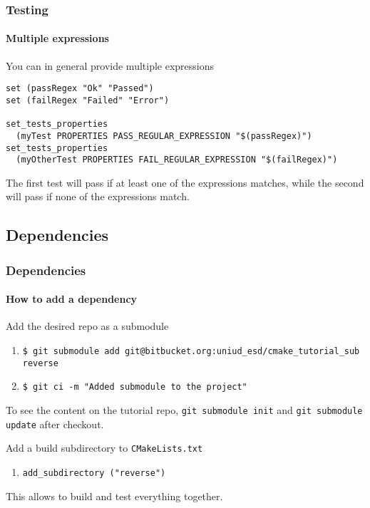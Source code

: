 \begin{frame}[fragile]
\frametitle{Testing}
\framesubtitle{Multiple expressions}

\begin{block}{You can in general provide multiple expressions}
{\scriptsize
\begin{verbatim}
set (passRegex "Ok" "Passed")
set (failRegex "Failed" "Error")

set_tests_properties 
  (myTest PROPERTIES PASS_REGULAR_EXPRESSION "$(passRegex)")
set_tests_properties 
  (myOtherTest PROPERTIES FAIL_REGULAR_EXPRESSION "$(failRegex)")
\end{verbatim}
}
The first test will pass if at least one of the expressions matches, while the second will pass if none of the expressions match.
\end{block}

\end{frame}

\subsection{Dependencies}

\begin{frame}
\frametitle{Dependencies}
\framesubtitle{How to add a dependency}

\begin{block}{Add the desired repo as a submodule}
\begin{enumerate}
\item {\scriptsize \texttt{\$ git submodule add git@bitbucket.org:uniud\_esd/cmake\_tutorial\_sub reverse} }
\item {\scriptsize \texttt{\$ git ci -m "Added submodule to the project"}}
\end{enumerate}
To see the content on the tutorial repo, \texttt{git submodule init} and \texttt{git submodule update} after checkout.
\end{block}
\pause
\begin{block}{Add a build subdirectory to \texttt{CMakeLists.txt}}
\begin{enumerate}
\item \texttt{add\_subdirectory ("reverse")}
\end{enumerate}
This allows to build and test everything together.
\end{block}

\end{frame}

